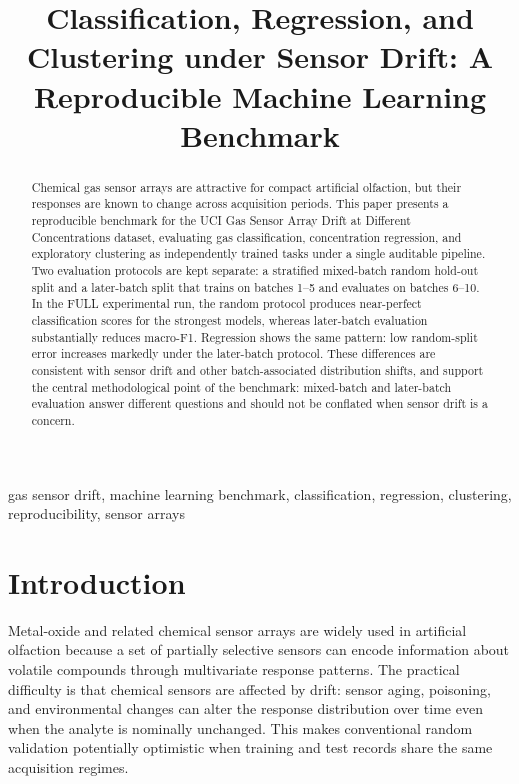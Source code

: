 \documentclass[conference]{IEEEtran}
\begin{document}
\title{Classification, Regression, and Clustering under Sensor Drift: A Reproducible Machine Learning Benchmark}

\author{
}

\maketitle

\begin{abstract}
Chemical gas sensor arrays are attractive for compact artificial olfaction, but their responses are known to change across acquisition periods. This paper presents a reproducible benchmark for the UCI Gas Sensor Array Drift at Different Concentrations dataset, evaluating gas classification, concentration regression, and exploratory clustering as independently trained tasks under a single auditable pipeline. Two evaluation protocols are kept separate: a stratified mixed-batch random hold-out split and a later-batch split that trains on batches 1--5 and evaluates on batches 6--10. In the FULL experimental run, the random protocol produces near-perfect classification scores for the strongest models, whereas later-batch evaluation substantially reduces macro-F1. Regression shows the same pattern: low random-split error increases markedly under the later-batch protocol. These differences are consistent with sensor drift and other batch-associated distribution shifts, and support the central methodological point of the benchmark: mixed-batch and later-batch evaluation answer different questions and should not be conflated when sensor drift is a concern.
\end{abstract}

\begin{IEEEkeywords}
gas sensor drift, machine learning benchmark, classification, regression, clustering, reproducibility, sensor arrays
\end{IEEEkeywords}

\section{Introduction}
Metal-oxide and related chemical sensor arrays are widely used in artificial olfaction because a set of partially selective sensors can encode information about volatile compounds through multivariate response patterns. The practical difficulty is that chemical sensors are affected by drift: sensor aging, poisoning, and environmental changes can alter the response distribution over time even when the analyte is nominally unchanged. This makes conventional random validation potentially optimistic when training and test records share the same acquisition regimes.
\end{document}
